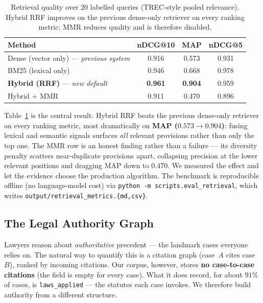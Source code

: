 \begin{table}[ht]
  \centering
  \caption{Retrieval quality over $20$ labelled queries (TREC-style pooled relevance).
  Hybrid RRF improves on the previous dense-only retriever on every ranking metric; MMR
  reduces quality and is therefore disabled.}
  \label{tab:ir}
  \begin{tabular}{lccc}
    \toprule
    \textbf{Method} & \textbf{nDCG@10} & \textbf{MAP} & \textbf{nDCG@5} \\
    \midrule
    Dense (vector only) --- \emph{previous system} & 0.916 & 0.573 & 0.931 \\
    BM25 (lexical only)                             & 0.946 & 0.668 & 0.978 \\
    \textbf{Hybrid (RRF)} --- \emph{new default}    & \textbf{0.961} & \textbf{0.904} & 0.959 \\
    Hybrid + MMR                                    & 0.911 & 0.470 & 0.896 \\
    \bottomrule
  \end{tabular}
\end{table}

Table~\ref{tab:ir} is the central result. Hybrid RRF beats the previous dense-only retriever
on every ranking metric, most dramatically on \textbf{MAP ($0.573 \rightarrow 0.904$)}:
fusing lexical and semantic signals surfaces \emph{all} relevant provisions rather than only
the top one. The MMR row is an honest finding rather than a failure --- its diversity penalty
scatters near-duplicate provisions apart, collapsing precision at the lower relevant positions
and dragging MAP down to $0.470$. We measured the effect and let the evidence choose the
production algorithm. The benchmark is reproducible offline (no language-model cost) via
\texttt{python -m scripts.eval\_retrieval}, which writes
\texttt{output/retrieval\_metrics.\{md,csv\}}.

\subsection{The Legal Authority Graph}
\label{sec:graph}

Lawyers reason about \emph{authoritative} precedent --- the landmark cases everyone relies on.
The natural way to quantify this is a citation graph (case~$A$ cites case~$B$), ranked by
incoming citations. Our corpus, however, stores \textbf{no case-to-case citations} (the field
is empty for every case). What it does record, for about $91\%$ of cases, is
\texttt{laws\_applied} --- the statutes each case invokes. We therefore build authority from a
different structure.

